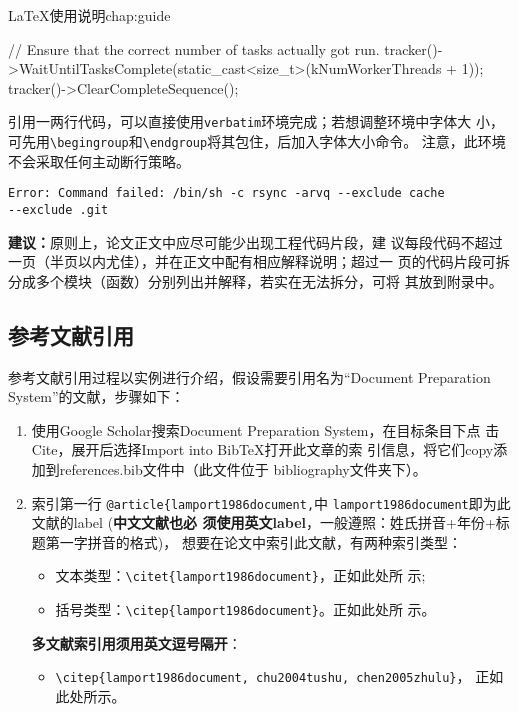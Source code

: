 \begin{cuzchapter}{\LaTeX{}使用说明}{chap:guide}
\begin{listing}[H]
\begin{cppcode}
            // Ensure that the correct number of tasks actually got run.
            tracker()->WaitUntilTasksComplete(static_cast<size_t>(kNumWorkerThreads + 1));
            tracker()->ClearCompleteSequence();
        \end{cppcode}
    \end{listing}

	引用一两行代码，可以直接使用\texttt{verbatim}环境完成；若想调整环境中字体大
	小，可先用\verb|\begingroup|和\verb|\endgroup|将其包住，后加入字体大小命令。
	注意，此环境不会采取任何主动断行策略。

	\begingroup
	\small
	\begin{verbatim}
Error: Command failed: /bin/sh -c rsync -arvq --exclude cache
--exclude .git 
    \end{verbatim}
	\endgroup

	\begin{leftbar}
		\noindent\textbf{建议：}原则上，论文正文中应尽可能少出现工程代码片段，建
		议每段代码不超过一页（半页以内尤佳），并在正文中配有相应解释说明；超过一
		页的代码片段可拆分成多个模块（函数）分别列出并解释，若实在无法拆分，可将
		其放到附录中。
	\end{leftbar}

	\subsection{参考文献引用}\label{sub:references}

	参考文献引用过程以实例进行介绍，假设需要引用名为``Document Preparation
	System''的文献，步骤如下：
	\begin{enumerate}
		\item 使用Google Scholar搜索Document Preparation System，在目标条目下点
		      击Cite，展开后选择Import into BibTeX打开此文章的索
		      引信息，将它们copy添加到references.bib文件中（此文件位于
		      bibliography文件夹下）。
		\item 索引第一行 \verb|@article{lamport1986document,|中
		      \verb|lamport1986document|即为此文献的label (\textbf{中文文献也必
			      须使用英文label}，一般遵照：姓氏拼音+年份+标题第一字拼音的格式)，
		      想要在论文中索引此文献，有两种索引类型：
		      \begin{itemize}
			      \item 文本类型：\verb|\citet{lamport1986document}|，正如此处所
			            示\citet{lamport1986document};
			      \item 括号类型：\verb|\citep{lamport1986document}|。正如此处所
			            示\citep{lamport1986document}。
		      \end{itemize}
		      \textbf{多文献索引用须用英文逗号隔开}：
		      \begin{itemize}
			      \item \verb|\citep{lamport1986document, chu2004tushu, chen2005zhulu}|，
			            正如此处所示\citep{lamport1986document, chu2004tushu, chen2005zhulu}。
		      \end{itemize}
	\end{enumerate}


\end{cuzchapter}
